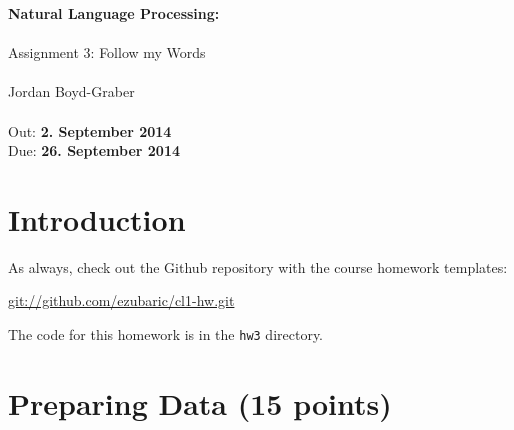 \documentclass[11pt]{article}
\begin{document}
\begin{center}
{\Large{\textbf{ Natural Language Processing:  }}}\\
\mbox{}\\
{\Large{Assignment 3: Follow my Words}}\\
\mbox{}\\
{\large{Jordan Boyd-Graber}}\\
\mbox{}\\
{\large{Out: \textbf{2. September 2014}\\Due: \textbf{26. September 2014}}}\\
\end{center}


{}

\section*{Introduction} %
\label{sec:introduction}
As always, check out the Github repository with the course homework templates:

\url{git://github.com/ezubaric/cl1-hw.git}

The code for this homework is in the \texttt{hw3} directory.

\section{Preparing Data (15 points)}
\end{document}
